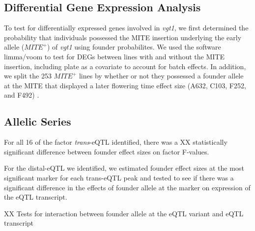 \documentclass[article,9pt,twocolumn,twoside]{rilabRxiv}
\begin{document}

\subsection{Differential Gene Expression Analysis}
To test for differentially expressed genes involved in \textit{vgt1}, we first determined the probability that individuals possessed the MITE insertion underlying the early allele ($MITE^+$) of \textit{vgt1} using founder probabilites.
We used the software limma/voom to test for DEGs between lines with and without the MITE insertion, including plate as a covariate to account for batch effects. 
In addition, we split the 253 $MITE^+$ lines by whether or not they possessed a founder allele at the MITE that displayed a later flowering time effect size (A632, C103, F252, and F492) \citep{Odell}.


\subsection{Allelic Series}

For all 16 of the factor \textit{trans}-eQTL identified, there was a XX statistically significant difference between founder effect sizes on factor F-values. 

For the distal-eQTL we identified, we estimated founder effect sizes at the most significant marker for each trans-eQTL peak and tested to see if there was a significant difference in the effects of founder allele at the marker on expression of the eQTL transcript.

XX Tests for interaction between founder allele at the eQTL variant and eQTL transcript
\end{document}
